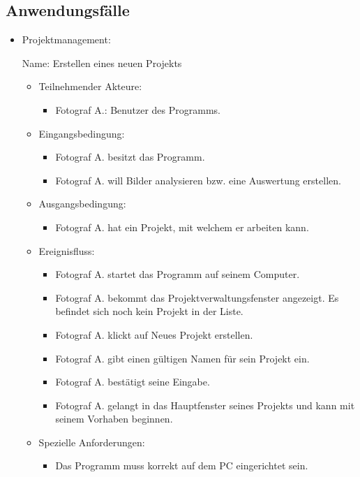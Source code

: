 \subsection{Anwendungsfälle}
	\begin{itemize}
		\item Projektmanagement:
		
		Name: Erstellen eines neuen Projekts
		\begin{itemize}
			\item Teilnehmender Akteure:
			\begin{itemize}
				\item	Fotograf A.: Benutzer des Programms.
			\end{itemize}
			\item Eingangsbedingung:
			\begin{itemize}
				\item Fotograf A. besitzt das Programm.
				\item Fotograf A. will Bilder analysieren bzw. eine Auswertung erstellen.						
			\end{itemize}
			\item Ausgangsbedingung:
			\begin{itemize}
				\item	Fotograf A. hat ein Projekt, mit welchem er arbeiten kann.		
			\end{itemize}
			\item Ereignisfluss:
			\begin{itemize}
				\item Fotograf A. startet das Programm auf seinem Computer.
				\item Fotograf A. bekommt das Projektverwaltungsfenster angezeigt. Es befindet sich noch kein Projekt in der Liste.
				\item Fotograf A. klickt auf Neues Projekt erstellen.
				\item Fotograf A. gibt einen gültigen Namen für sein Projekt ein.
				\item Fotograf A. bestätigt seine Eingabe.
				\item Fotograf A. gelangt in das Hauptfenster seines Projekts und kann mit seinem Vorhaben beginnen.							
			\end{itemize}
			\item Spezielle Anforderungen:
			\begin{itemize}
				\item	Das Programm muss korrekt auf dem PC eingerichtet sein.		
			\end{itemize}			
		\end{itemize}
		

\end{itemize}
